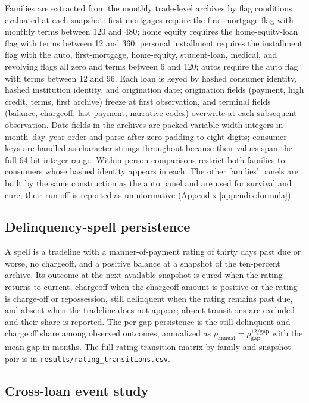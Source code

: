 \documentclass[12pt,english]{article}
\begin{document}
Families are extracted from the monthly trade-level archives by flag conditions evaluated at each snapshot: first mortgages require the first-mortgage flag with monthly terms between 120 and 480; home equity requires the home-equity-loan flag with terms between 12 and 360; personal installment requires the installment flag with the auto, first-mortgage, home-equity, student-loan, medical, and revolving flags all zero and terms between 6 and 120; autos require the auto flag with terms between 12 and 96. Each loan is keyed by hashed consumer identity, hashed institution identity, and origination date; origination fields (payment, high credit, terms, first archive) freeze at first observation, and terminal fields (balance, chargeoff, last payment, narrative codes) overwrite at each subsequent observation. Date fields in the archives are packed variable-width integers in month--day--year order and parse after zero-padding to eight digits; consumer keys are handled as character strings throughout because their values span the full 64-bit integer range. Within-person comparisons restrict both families to consumers whose hashed identity appears in each. The other families' panels are built by the same construction as the auto panel and are used for survival and cure; their run-off is reported as uninformative (Appendix \ref{appendix:formula}).

\subsection{Delinquency-spell persistence}

A spell is a tradeline with a manner-of-payment rating of thirty days past due or worse, no chargeoff, and a positive balance at a snapshot of the ten-percent archive. Its outcome at the next available snapshot is cured when the rating returns to current, chargeoff when the chargeoff amount is positive or the rating is charge-off or repossession, still delinquent when the rating remains past due, and absent when the tradeline does not appear; absent transitions are excluded and their share is reported. The per-gap persistence is the still-delinquent and chargeoff share among observed outcomes, annualized as $\rho_{\text{annual}} = \rho_{\text{gap}}^{12/\text{gap}}$ with the mean gap in months. The full rating-transition matrix by family and snapshot pair is in \texttt{results/rating\_transitions.csv}.

\subsection{Cross-loan event study}
\end{document}
